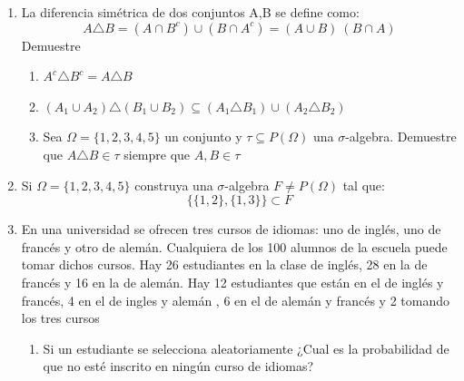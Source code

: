\documentclass[12pt,a4paper]{report}
\begin{document}
\begin{enumerate}
   \item {
  La diferencia simétrica de dos conjuntos A,B se define como:\\

		$$A\triangle B = (A \cap B^c)\cup (B \cap A^c)=(A \cup B)\ (B \cap A)$$
Demuestre
\begin{enumerate}[label=\alph*) ]
	\item{$A^c \triangle B^c = A \triangle B $ \\
		
	} 
	
	\item{$ (A_{1} \cup A_{2})\triangle (B_{1} \cup B_{2})\subseteq (A_{1} \triangle B_{1}) \cup (A_{2} \triangle B_{2}) $ \\
		
	} 
	
	\item{Sea $\Omega = \lbrace 1,2,3,4,5 \rbrace  $ un conjunto y $\tau \subseteq P(\Omega)$ una $\sigma$-algebra. Demuestre que $A \triangle B \in \tau $ siempre que $A,B \in \tau $ \\
		
	} 
	
	
	
\end{enumerate}

	}

   \item {
    Si $\Omega = \lbrace 1,2,3,4,5 \rbrace$ construya una $\sigma$-algebra $F \neq P(\Omega)$ tal que:\\
    $$\lbrace \lbrace 1,2 \rbrace , \lbrace 1,3 \rbrace \rbrace \subset F$$ 
		
	}


   \item {
   En una universidad se ofrecen tres cursos de idiomas: uno  de inglés, uno de francés y otro de alemán. Cualquiera de los 100 alumnos de la escuela puede tomar dichos cursos. Hay 26 estudiantes en la clase de inglés, 28 en la de francés y 16 en la de alemán. Hay 12 estudiantes que están en el de inglés y francés, 4 en el de ingles y alemán , 6 en el de alemán y francés y 2 tomando los tres cursos\\

	\begin{enumerate}[label=\alph*) ]
   \item {
	Si un estudiante se selecciona aleatoriamente ¿Cual es la probabilidad de que no esté inscrito en ningún curso de idiomas?\\


}
\end{enumerate}}
\end{enumerate}
\end{document}
